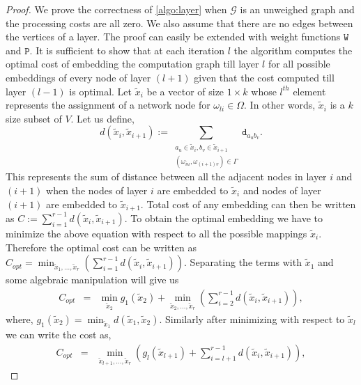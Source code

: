 \documentclass[journal]{IEEEtran}
\newcommand{\netnodes}{V}
\newcommand{\compgraph}{\mathcal{G}}
\newcommand{\compnodes}{\Omega}
\newcommand{\compedges}{\Gamma}
\newcommand{\distance}{\mathtt{d}} \newcommand{\edgewt}{\mathtt{W}} \newcommand{\processingwt}{\mathtt{P}}
\begin{document}
\begin{proof}
  We prove the correctness of \ref{algo:layer} when $\compgraph$ is an
  unweighed graph and the processing costs are all zero.  We also
  assume that there are no edges between the vertices of a layer. The
  proof can easily be extended with weight functions $\edgewt$ and $\processingwt.$ It
  is sufficient to show that at each iteration $l$ the algorithm
  computes the optimal cost of embedding the computation graph till
  layer $l$ for all possible embeddings of every node of layer $(l+1)$
  given that the cost computed till layer $(l-1)$ is optimal. Let
  $\tilde{x}_i$ be a vector of size $1 \times k$ whose $l^{th}$
  element represents the assignment of a network node for $\omega_{li}
  \in \compnodes.$ In other words, $\tilde{x}_i$ is a $k$ size subset
  of $\netnodes.$ Let us define,
\begin{equation}
    d(\tilde{x}_i,\tilde{x}_{i+1}) := \sum\limits_{\substack{a_u \in
        \tilde{x}_i, b_v \in \tilde{x}_{i+1}
        \\ (\omega_{iu},\omega_{(i+1)v}) \in \compedges}}
    \distance_{a_ub_v}. \label{dist}
  \end{equation}
This represents the sum of distance between all the adjacent nodes
  in layer $i$ and $(i+1)$ when the nodes of layer $i$ are embedded to
  $\tilde{x}_i$ and nodes of layer $(i+1)$ are embedded to
  $\tilde{x}_{i+1}.$ Total cost of any embedding can then be written
  as $C := \sum\limits_{ i=1}^{r-1} d(\tilde{x}_i,\tilde{x}_{i+1}). $
  To obtain the optimal embedding we have to minimize the above
  equation with respect to all the possible mappings $\tilde{x}_i.$
  Therefore the optimal cost can be written as $C_{opt} = \min_{\tilde{x}_1,\ldots,\tilde{x}_r} \left(\sum\limits_{i=1}^{r-1} d(\tilde{x}_i,\tilde{x}_{i+1})\right).$
  Separating the terms with $\tilde{x}_1$ and some algebraic
  manipulation will give us
\begin{eqnarray}
    C_{opt} &=& \min_{\tilde{x}_2} g_1(\tilde{x}_2) + 
    \min_{\tilde{x}_2,\ldots,\tilde{x}_r} \left(\sum\limits_{
      i=2}^{r-1} d(\tilde{x}_i,\tilde{x}_{i+1})\right), \label{g_1}  
  \end{eqnarray}     
where, $g_1(\tilde{x}_2) = \min_{\tilde{x}_1}
  d(\tilde{x}_1,\tilde{x}_2).$ Similarly after minimizing with respect 
  to $\tilde{x}_l$ we can write the cost as,
\begin{eqnarray}
    C_{opt} &=&  \min_{\tilde{x}_{l+1},\ldots,\tilde{x}_r}
    \left(g_l(\tilde{x}_{l+1}) + \sum\limits_{ i=l+1}^{r-1}
    d(\tilde{x}_i,\tilde{x}_{i+1})\right), \label{g_l} 

\end{eqnarray}
\end{proof}
\end{document}
